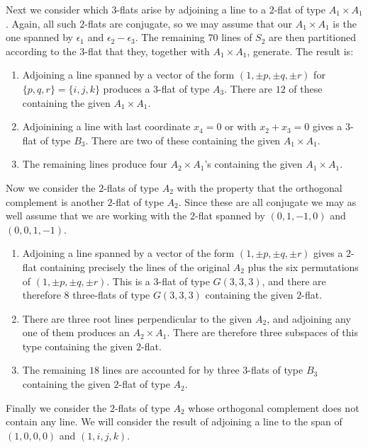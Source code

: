 \documentclass[11pt, reqno]{amsart}
\numberwithin{equation}{section}
\theoremstyle{definition}
\theoremstyle{plain}
\begin{document}
Next we consider which $3$-flats arise by adjoining a line to a $2$-flat of type $A_1 \times A_1$. Again, all such $2$-flats are conjugate, so we may assume that our $A_1 \times A_1$ is the one spanned by $\epsilon_1$ and $\epsilon_2-\epsilon_3$. The remaining $70$ lines of $S_2$ are then partitioned according to the $3$-flat that they, together with $A_1 \times A_1$, generate. The result is:
\begin{enumerate}
\item[(a)] Adjoining a line spanned by a vector of the form $(1,\pm p ,\pm q, \pm r)$ for $\{p,q,r \}=\{i,j,k\}$ produces a $3$-flat of type $A_3$. There are $12$ of these containing the given $A_1 \times A_1$.
\item[(b)] Adjoinining a line with last coordinate $x_4=0$ or with $x_2+x_3=0$ gives a $3$-flat of type $B_3$. There are two of these containing the given $A_1 \times A_1$.
\item[(c)] The remaining lines produce four $A_2 \times A_1$'s containing the given $A_1 \times A_1$.
\end{enumerate} 

Now we consider the $2$-flats of type $A_2$ with the property that the orthogonal complement is another $2$-flat of type $A_2$. Since these are all conjugate we may as well assume that we are working with the $2$-flat spanned by $(0,1,-1,0)$ and $(0,0,1,-1)$. 
\begin{enumerate}
\item[(a)] Adjoining a line spanned by a vector of the form $(1,\pm p , \pm q, \pm r)$ gives a $2$-flat containing precisely the lines of the original $A_2$ plus the six permutations of $(1,\pm p,\pm q,\pm r)$. This is a $3$-flat of type $G(3,3,3)$, and there are therefore $8$ three-flats of type $G(3,3,3)$ containing the given $2$-flat.
\item[(b)] There are three root lines perpendicular to the given $A_2$, and adjoining any one of them produces an $A_2 \times A_1$. There are therefore three subspaces of this type containing the given $2$-flat.
\item[(c)] The remaining $18$ lines are accounted for by three $3$-flats of type $B_3$ containing the given $2$-flat of type $A_2$. 
\end{enumerate}

Finally we consider the $2$-flats of type $A_2$ whose orthogonal complement does not contain any line. We will consider the result of adjoining a line to the span of $(1,0,0,0)$ and $(1,i,j,k)$. 
\end{document}
